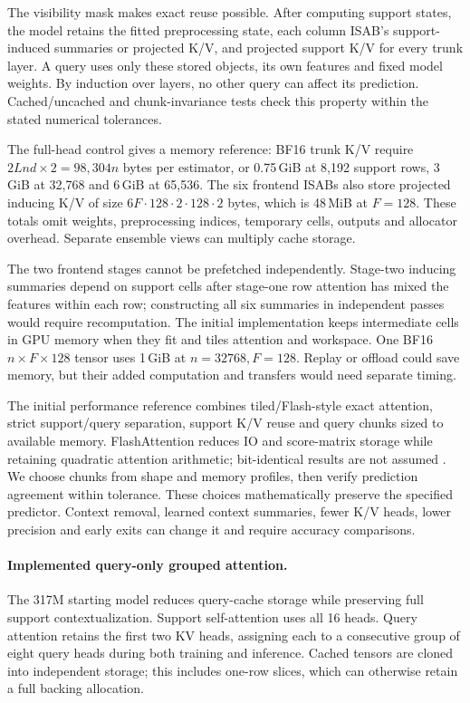 \documentclass[11pt]{article}
\begin{document}
The visibility mask makes exact reuse possible. After computing support states, the model retains the fitted preprocessing state, each column ISAB's support-induced summaries or projected K/V, and projected support K/V for every trunk layer. A query uses only these stored objects, its own features and fixed model weights. By induction over layers, no other query can affect its prediction. Cached/uncached and chunk-invariance tests check this property within the stated numerical tolerances.

The full-head control gives a memory reference: BF16 trunk K/V require $2Lnd\times2=98{,}304n$ bytes per estimator, or 0.75\,GiB at 8,192 support rows, 3\,GiB at 32,768 and 6\,GiB at 65,536. The six frontend ISABs also store projected inducing K/V of size $6F\cdot128\cdot2\cdot128\cdot2$ bytes, which is 48\,MiB at $F=128$. These totals omit weights, preprocessing indices, temporary cells, outputs and allocator overhead. Separate ensemble views can multiply cache storage.

The two frontend stages cannot be prefetched independently. Stage-two inducing summaries depend on support cells after stage-one row attention has mixed the features within each row; constructing all six summaries in independent passes would require recomputation. The initial implementation keeps intermediate cells in GPU memory when they fit and tiles attention and workspace. One BF16 $n\times F\times128$ tensor uses 1\,GiB at $n=32768,F=128$. Replay or offload could save memory, but their added computation and transfers would need separate timing.

The initial performance reference combines tiled/Flash-style exact attention, strict support/query separation, support K/V reuse and query chunks sized to available memory. FlashAttention reduces IO and score-matrix storage while retaining quadratic attention arithmetic; bit-identical results are not assumed \cite{flashattention}. We choose chunks from shape and memory profiles, then verify prediction agreement within tolerance. These choices mathematically preserve the specified predictor. Context removal, learned context summaries, fewer K/V heads, lower precision and early exits can change it and require accuracy comparisons.

\paragraph{Implemented query-only grouped attention.} The 317M starting model reduces query-cache storage while preserving full support contextualization. Support self-attention uses all 16 heads. Query attention retains the first two KV heads, assigning each to a consecutive group of eight query heads during both training and inference. Cached tensors are cloned into independent storage; this includes one-row slices, which can otherwise retain a full backing allocation.
\end{document}
